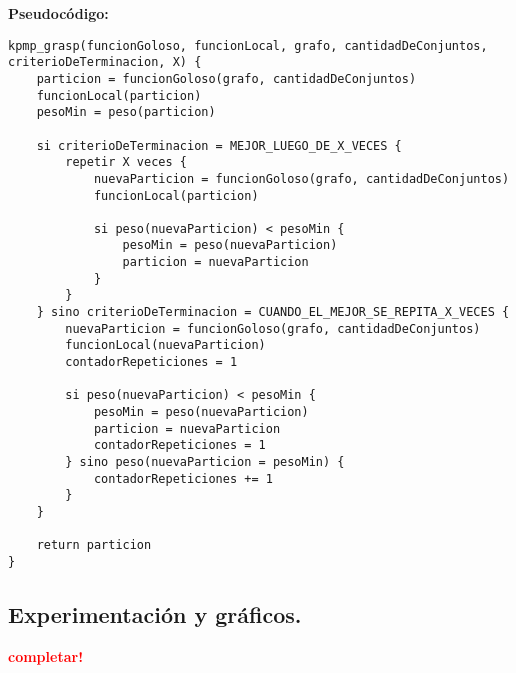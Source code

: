 \textbf{Pseudocódigo:}

\vspace*{0.3cm}

\begin{verbatim}
kpmp_grasp(funcionGoloso, funcionLocal, grafo, cantidadDeConjuntos, criterioDeTerminacion, X) {
    particion = funcionGoloso(grafo, cantidadDeConjuntos)
    funcionLocal(particion)
    pesoMin = peso(particion)

    si criterioDeTerminacion = MEJOR_LUEGO_DE_X_VECES {
        repetir X veces {
            nuevaParticion = funcionGoloso(grafo, cantidadDeConjuntos)
            funcionLocal(particion)

            si peso(nuevaParticion) < pesoMin {
                pesoMin = peso(nuevaParticion)
                particion = nuevaParticion
            }
        }
    } sino criterioDeTerminacion = CUANDO_EL_MEJOR_SE_REPITA_X_VECES {
        nuevaParticion = funcionGoloso(grafo, cantidadDeConjuntos)
        funcionLocal(nuevaParticion)
        contadorRepeticiones = 1

        si peso(nuevaParticion) < pesoMin {
            pesoMin = peso(nuevaParticion)
            particion = nuevaParticion
            contadorRepeticiones = 1
        } sino peso(nuevaParticion = pesoMin) {
            contadorRepeticiones += 1
        }
    }

    return particion
}
\end{verbatim}



\newpage
\subsection{Experimentación y gráficos.}
\vspace*{0.3cm}
\textcolor{red}{\textbf{completar!}}
